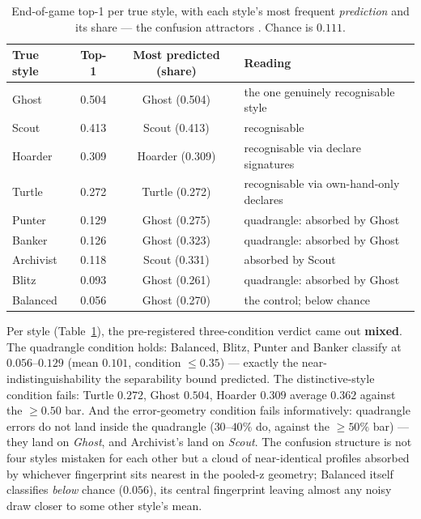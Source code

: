 \documentclass[11pt]{article}
\begin{document}
\begin{table}[t]
\centering
\caption{End-of-game top-1 per true style, with each style's most frequent
\emph{prediction} and its share --- the confusion attractors \cite{artifact}. Chance is
$0.111$.}
\label{tab:clsstyle}
\footnotesize
\begin{tabular}{@{}lccl@{}}
\toprule
True style & Top-1 & Most predicted (share) & Reading \\
\midrule
Ghost     & 0.504 & Ghost (0.504)  & the one genuinely recognisable style \\
Scout     & 0.413 & Scout (0.413)  & recognisable \\
Hoarder   & 0.309 & Hoarder (0.309) & recognisable via declare signatures \\
Turtle    & 0.272 & Turtle (0.272) & recognisable via own-hand-only declares \\
Punter    & 0.129 & Ghost (0.275)  & quadrangle: absorbed by Ghost \\
Banker    & 0.126 & Ghost (0.323)  & quadrangle: absorbed by Ghost \\
Archivist & 0.118 & Scout (0.331)  & absorbed by Scout \\
Blitz     & 0.093 & Ghost (0.261)  & quadrangle: absorbed by Ghost \\
Balanced  & 0.056 & Ghost (0.270)  & the control; below chance \\
\bottomrule
\end{tabular}
\end{table}

Per style (Table~\ref{tab:clsstyle}), the pre-registered three-condition verdict came out
\textbf{mixed}. The quadrangle condition holds: Balanced, Blitz, Punter and Banker
classify at $0.056$--$0.129$ (mean $0.101$, condition $\le 0.35$) --- exactly the
near-indistinguishability the separability bound predicted. The distinctive-style
condition fails: Turtle $0.272$, Ghost $0.504$, Hoarder $0.309$ average $0.362$ against
the $\ge 0.50$ bar. And the error-geometry condition fails informatively: quadrangle
errors do not land inside the quadrangle ($30$--$40\%$ do, against the $\ge 50\%$ bar) ---
they land on \emph{Ghost}, and Archivist's land on \emph{Scout}. The confusion structure
is not four styles mistaken for each other but a cloud of near-identical profiles absorbed
by whichever fingerprint sits nearest in the pooled-z geometry; Balanced itself classifies
\emph{below} chance ($0.056$), its central fingerprint leaving almost any noisy draw
closer to some other style's mean.
\end{document}
